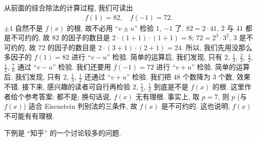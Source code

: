 \begin{example}
    从前面的综合除法的计算过程, 我们可读出
    \begin{align*}
        f(1) = 82, \quad f(-1) = 72.
    \end{align*}
    $\pm 1$ 自然不是 $f(x)$ 的根, 故不必用 ``$v \pm u$'' 检验 $1$, $-1$ 了. $82 = 2 \cdot 41$, $2$ 与 $41$ 都是不可约的, 故 $82$ 的因子的数目是 $2 \cdot (1+1) \cdot (1+1) = 8$; $72 = 2^3 \cdot 3^2$, $3$ 是不可约的, 故 $72$ 的因子的数目是 $2 \cdot (3+1) \cdot (2+1) = 24$. 所以, 我们先用没那么多因子的 $f(1) = 82$ 进行 ``$v - u$'' 检验. 简单的运算后, 我们发现, 只有 $2$, $\frac{1}{3}$, $\frac{2}{3}$, $\frac{4}{3}$, $\frac{1}{2}$, $\frac{7}{6}$ 通过 ``$v - u$'' 检验. 我们还要用 $f(-1) = 72$ 进行 ``$v + u$'' 检验. 简单的运算后, 我们发现, 只有 $2$, $\frac{1}{3}$, $\frac{1}{2}$ 还通过 ``$v + u$'' 检验. 我们把 $48$ 个数降为 $3$ 个数, 效果不错. 接下来, 感兴趣的读者可自行再检验 $2$, $\frac{1}{3}$, $\frac{1}{2}$ 到底是不是 $f(x)$ 的根. 这里作者给个参考答案: 都不是; 换句话说, $f(x)$ 无有理根. 事实上, 取 $p = 7$, 则 $p$ (与 $f(x)$) 适合 Eisenstein 判别法的三条件, 故 $f(x)$ 是不可约的. 这也说明, $f(x)$ 不可能有有理根.
\end{example}

下例是 ``知乎'' 的一个讨论较多的问题.

